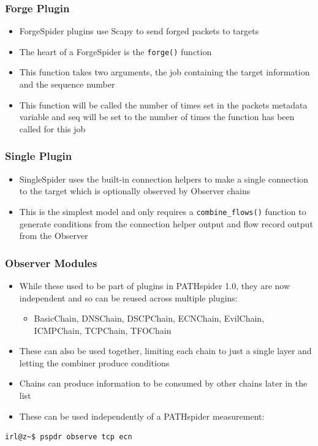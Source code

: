 \documentclass{beamer}
\begin{document}
\begin{frame}
\frametitle{Forge Plugin}
\begin{itemize}[<+->]
\item{ForgeSpider plugins use Scapy to send forged packets to targets}
\item{The heart of a ForgeSpider is the \texttt{forge()} function}
\item{This function takes two arguments, the job containing the target
information and the sequence number}
\item{This function will be called the number of times set in the packets
metadata variable and seq will be set to the number of times the function has
been called for this job}
\end{itemize}
\end{frame}

\begin{frame}
\frametitle{Single Plugin}
\begin{itemize}[<+->]
\item{SingleSpider uses the built-in connection helpers to make a single
connection to the target which is optionally observed by Observer chains}
\item{This is the simplest model and only requires a \texttt{combine\_flows()}
function to generate conditions from the connection helper output and flow
record output from the Observer}
\end{itemize}
\end{frame}

\begin{frame}[fragile]
\frametitle{Observer Modules}
\begin{itemize}
\item{While these used to be part of plugins in PATHspider 1.0, they are now independent and so can be reused across multiple plugins:}
\begin{itemize}
\item{BasicChain, DNSChain, DSCPChain, ECNChain, EvilChain, ICMPChain, TCPChain, TFOChain}
\end{itemize}
\item{These can also be used together, limiting each chain to just a single layer and letting the combiner produce conditions}
\item{Chains can produce information to be consumed by other chains later in the list}
\item{These can be used independently of a PATHspider measurement:}
\end{itemize}
\begin{lstlisting}[caption={Running the PATHspider Observer independently}]
irl@z~$ pspdr observe tcp ecn
\end{lstlisting}
\end{frame}
\end{document}

